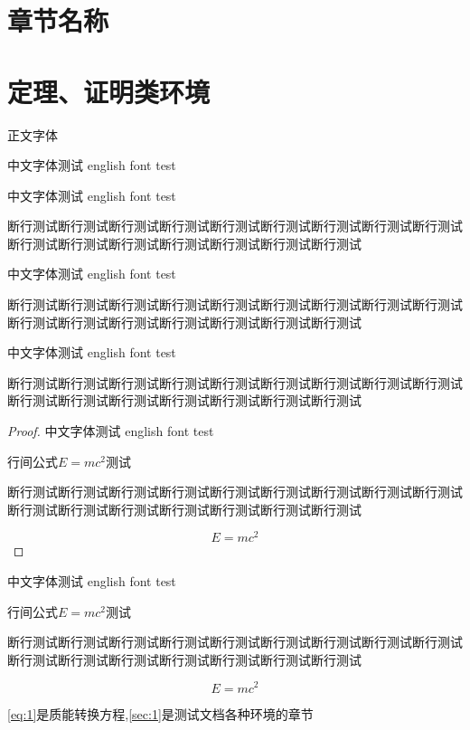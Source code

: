 \documentclass[../../main.tex]{subfiles}
\begin{document}
\section{章节名称}



\section{定理、证明类环境}\label{sec:1}
正文字体\par
中文字体测试 english font test
\begin{definition}
中文字体测试 english font test\par
断行测试断行测试断行测试断行测试断行测试断行测试断行测试断行测试断行测试断行测试断行测试断行测试断行测试断行测试断行测试断行测试\par
\end{definition}

\begin{theorem}
中文字体测试 english font test\par
断行测试断行测试断行测试断行测试断行测试断行测试断行测试断行测试断行测试断行测试断行测试断行测试断行测试断行测试断行测试断行测试\par
\end{theorem}

\begin{theorem}[勾股定理]
中文字体测试 english font test\par
断行测试断行测试断行测试断行测试断行测试断行测试断行测试断行测试断行测试断行测试断行测试断行测试断行测试断行测试断行测试断行测试\par

\begin{proof}
中文字体测试 english font test\par
行间公式$E=mc^2$测试\par
断行测试断行测试断行测试断行测试断行测试断行测试断行测试断行测试断行测试断行测试断行测试断行测试断行测试断行测试断行测试断行测试\par
\begin{equation}
	E=mc^2
\end{equation}
\end{proof}


\begin{solution}
中文字体测试 english font test\par
行间公式$E=mc^2$测试\par
断行测试断行测试断行测试断行测试断行测试断行测试断行测试断行测试断行测试断行测试断行测试断行测试断行测试断行测试断行测试断行测试\par
\begin{equation}
\label{eq:1}
	E=mc^2
\end{equation}
\end{solution}


\autoref{eq:1}是质能转换方程,\autoref{sec:1}是测试文档各种环境的章节
\end{theorem}
\end{document}
